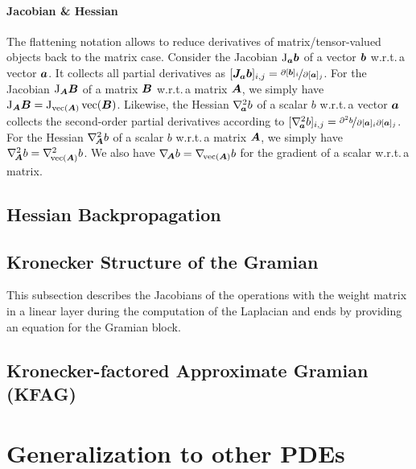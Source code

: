 \documentclass{article}
\begin{document}
\paragraph{Jacobian \& Hessian} The flattening notation allows to reduce derivatives of matrix/tensor-valued objects back to the matrix case.
Consider the Jacobian $\mathrm{J}_{{\bm{a}}}{\bm{b}}$ of a vector ${\bm{b}}$ w.r.t.\,a vector ${\bm{a}}$.
It collects all partial derivatives as $[{\bm{J}}_{{\bm{a}}}{\bm{b}}]_{i,j} = \nicefrac{\partial [{\bm{b}}]_i}{\partial [{\bm{a}}]_j}$.
For the Jacobian $\mathrm{J}_{{\bm{A}}}{\bm{B}}$ of a matrix ${\bm{B}}$ w.r.t.\,a matrix ${\bm{A}}$, we simply have $\mathrm{J}_{{\bm{A}}} {\bm{B}} = \mathrm{J}_{\operatorname{vec}( {\bm{A}} )}\operatorname{vec}({\bm{B}})$.
Likewise, the Hessian $\nabla_{\!{{\bm{a}}}}^{2}b$ of a scalar $b$ w.r.t.\,a vector ${\bm{a}}$ collects the second-order partial derivatives according to $[\nabla_{\!{{\bm{a}}}}^{2}b]_{i,j} = \nicefrac{\partial^2 b}{\partial [{\bm{a}}]_i \partial [{\bm{a}}]_j}$.
For the Hessian $\nabla_{\!{{\bm{A}}}}^{2} b$ of a scalar $b$ w.r.t.\,a matrix ${\bm{A}}$, we simply have $\nabla_{\!{{\bm{A}}}}^{2} b = \nabla_{\!{\operatorname{vec}({\bm{A}})}}^{2}b$.
We also have $\nabla_{\!{{\bm{A}}}} b = \nabla_{\!{\operatorname{vec}({\bm{A}})}} b$ for the gradient of a scalar w.r.t.\,a matrix.


\subsection{Hessian Backpropagation}\label{sec:laplacian-computation-graph}


\subsection{Kronecker Structure of the Gramian}\label{sec:kronecker-structure-gramian}

This subsection describes the Jacobians of the operations with the weight matrix in
a linear layer during the computation of the Laplacian and ends by providing an
equation for the Gramian block.

\subsection{Kronecker-factored Approximate Gramian (KFAG)}


\section{Generalization to other PDEs}


\end{document}
